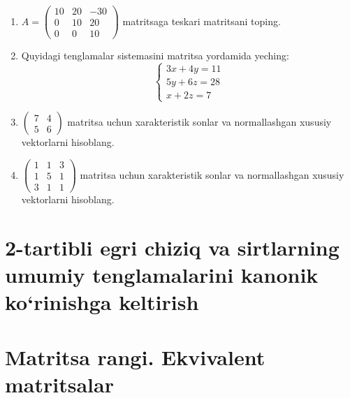 \begin{enumerate}
\item $A=\begin{pmatrix}
	10&20&-30\\0&10&20\\0&0&10
\end{pmatrix}$ matritsaga teskari matritsani toping.

\item Quyidagi tenglamalar sistemasini matritsa yordamida yeching:
$$\begin{cases}
	3x+4y=11\\5y+6z=28\\x+2z=7
\end{cases}$$

\item $\begin{pmatrix}
	7&4\\5&6
\end{pmatrix}
$ matritsa uchun xarakteristik sonlar va normallashgan xususiy vektorlarni hisoblang.

\item $\begin{pmatrix}
	1&1&3\\1&5&1\\3&1&1
\end{pmatrix}$ matritsa uchun xarakteristik sonlar va normallashgan xususiy vektorlarni hisoblang.
\end{enumerate}

\section{2-tartibli egri chiziq va sirtlarning umumiy tenglamalarini kanonik ko`rinishga keltirish}
\section{Matritsa rangi. Ekvivalent matritsalar}



